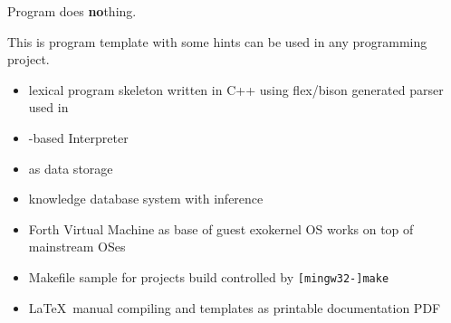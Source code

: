 \clearpage{}

{\Huge Program does \textbf{no}thing.}
\bigskip

This is program template with some hints can be used in any programming project.
\bigskip

\begin{itemize}[nosep]
  \item 
{} lexical program skeleton written in C++ using flex/bison
generated parser used in
  \item 
{}-based Interpreter
  \item 
{} as data storage
  \item 
knowledge database system with inference
  \item 
{} Forth Virtual Machine as base of guest exokernel OS works on top of
mainstream OSes
  \item 
Makefile sample for projects build controlled by \verb|[mingw32-]make|
  \item 
\LaTeX\ manual compiling and templates as printable documentation PDF
\end{itemize}
